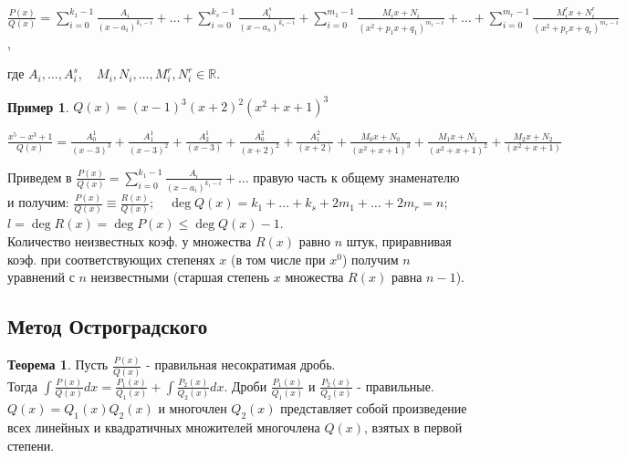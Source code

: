 \documentclass{report}
\theoremstyle{definition}
\newtheorem{example}{Пример}
\newtheorem{theorem}{Теорема}[section]
\begin{document}
\begin{center}
  {\Large $\frac{P(x)}{Q(x)} = \sum_{i = 0}^{k_{1}-1} \frac{A_{i}}{(x - a_{i})^{k_{1} - i}} + \ldots + \sum_{i = 0}^{k_{s} - 1}
      \frac{A^{s}_{i}}{(x - a_{s})^{k_{s} - i}} + \sum_{i = 0}^{m_{1} - 1} \frac{M_{i}x + N_{i}}{(x^{2} + p_{1}x + q_{1})
        ^{m_{1} - i}} + \ldots + \sum_{i = 0}^{m_{r} - 1} \frac{M_{i}^{r}x + N_{i}^{r}}{(x^{2} + p_{r}x + q_{r})^{m_{r} - i}}$, \\}
\end{center}

где $A_{i}, \ldots, A_{i}^{s}, \quad M_{i}, N_{i}, \ldots, M_{i}^{r}, N_{i}^{r} \in \mathbb{R}$.

\begin{example}
  $Q(x) = (x-1)^{3}(x+2)^{2}(x^{2} + x + 1)^{3}$
  \begin{center}
    {\Large $\frac{x^{5} - x^{3} + 1}{Q(x)} = \frac{A^{1}_{0}}{(x - 3)^{3}} + \frac{A^{1}_{1}}{(x - 3)^{2}} +
        \frac{A^{1}_{2}}{(x - 3)} + \frac{A^{2}_{0}}{(x + 2)^{2}} + \frac{A^{2}_{1}}{(x + 2)} + \frac{M_{0}x + N_{0}}
        {(x^{2} + x + 1)^{3}} + \frac{M_{1}x + N_{1}}{(x^{2} + x + 1)^{2}} + \frac{M_{2}x + N_{2}}{(x^{2} + x + 1)}$}
  \end{center}
\end{example}

Приведем в $\frac{P(x)}{Q(x)} = \sum_{i = 0}^{k_{1}-1} \frac{A_{i}}{(x - a_{i})^{k_{1} - i}} + \ldots$
правую часть к общему знаменателю и получим: $\frac{P(x)}{Q(x)} \equiv \frac{R(x)}{Q(x)}; \quad \deg Q(x) =
  k_{1} + \ldots + k_{s} + 2m_{1} + \ldots + 2m_{r} = n$; \\

$l = \deg R(x) = \deg P(x) \leqslant \deg Q(x) - 1$. \\

Количество неизвестных коэф. у множества $R(x)$ равно $n$ штук, приравнивая коэф. при соответствующих степенях
$x$ (в том числе при $x^{0}$) получим $n$ уравнений с $n$ неизвестными (старшая степень $x$ множества $R(x)$ равна $n-1$).

\subsection{Метод Остроградского}

\begin{theorem}
  Пусть $\frac{P(x)}{Q(x)}$ - правильная несократимая дробь. \\ Тогда $\int \frac{P(x)}{Q(x)}dx = \frac{P_{1}(x)}{Q_{1}(x)}
    + \int \frac{P_{2}(x)}{Q_{2}(x)}dx$. Дроби $\frac{P_{1}(x)}{Q_{1}(x)}$ и $\frac{P_{2}(x)}{Q_{2}(x)}$ - правильные.
  $Q(x) = Q_{1}(x) Q_{2}(x)$ и многочлен $Q_{2}(x)$ представляет собой произведение всех линейных и квадратичных множителей
  многочлена $Q(x)$, взятых в первой степени.
\end{theorem}
\end{document}

